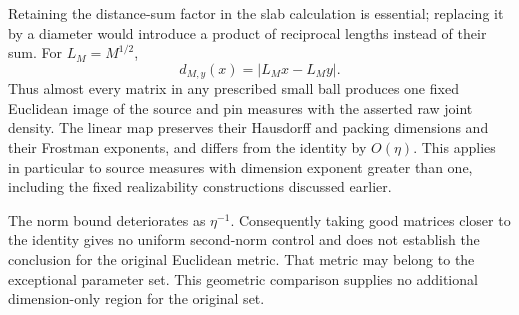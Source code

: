 Retaining the distance-sum factor in the slab calculation is essential;
replacing it by a diameter would introduce a product of reciprocal
lengths instead of their sum. For \(L_M=M^{1/2}\),
\[
 d_{M,y}(x)=|L_Mx-L_My|.
\]
Thus almost every matrix in any prescribed small ball produces one fixed
Euclidean image of the source and pin measures with the asserted raw
joint density. The linear map preserves their Hausdorff and packing
dimensions and their Frostman exponents, and differs from the identity
by \(O(\eta)\). This applies in particular to source measures with
dimension exponent greater than one, including the fixed realizability
constructions discussed earlier.

The norm bound deteriorates as \(\eta^{-1}\). Consequently taking good
matrices closer to the identity gives no uniform second-norm control and
does not establish the conclusion for the original Euclidean metric.
That metric may belong to the exceptional parameter set. This geometric
comparison supplies no additional dimension-only region for the original
set.
